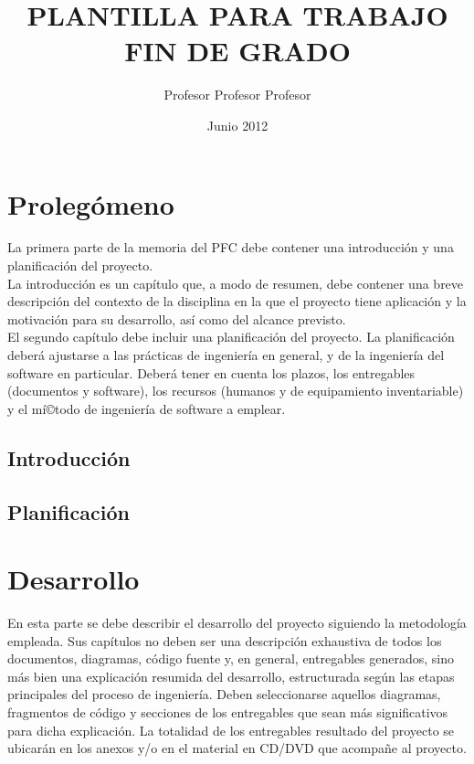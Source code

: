 \documentclass[a4paper,11pt]{book}
\title{PLANTILLA PARA TRABAJO FIN DE GRADO}
\author{Profesor Profesor Profesor}
\date{Junio 2012}
\begin{document}
\pagestyle{empty}


\cleardoublepage


\cleardoublepage


\newpage


\newpage


\frontmatter

\tableofcontents
\listoffigures
\listoftables

\mainmatter

\part{Prolegómeno}
\null\vfill
\noindent La primera parte de la memoria del PFC debe contener una introducción y una planificación del proyecto.\\

La introducción es un capí­tulo que, a modo de resumen, debe contener una breve descripción del contexto de la disciplina en la que el proyecto tiene aplicación y la motivación para su desarrollo, así­ como del alcance previsto.\\

El segundo capí­tulo debe incluir una planificación del proyecto. La planificación deberá ajustarse a las prácticas de ingenierí­a en general, y de la ingenierí­a del software en particular. Deberá tener en cuenta los plazos, los entregables (documentos y software), los recursos (humanos y de equipamiento inventariable) y el mí©todo de ingenierí­a de software a emplear.
\\

\chapter{Introducción}


\chapter{Planificación}


\part{Desarrollo}
\null\vfill
\noindent En esta parte se debe describir el desarrollo del proyecto siguiendo la metodologí­a empleada. Sus capí­tulos no deben ser una descripción exhaustiva de todos los documentos, diagramas, código fuente y, en general, entregables generados, sino más bien una explicación resumida del desarrollo, estructurada según las etapas principales del proceso de ingenierí­a. Deben seleccionarse aquellos diagramas, fragmentos de código y secciones de los entregables que sean más significativos para dicha explicación. La totalidad de los entregables resultado del proyecto se ubicarán en los anexos y/o en el material en CD/DVD que acompañe al proyecto.
\end{document}
